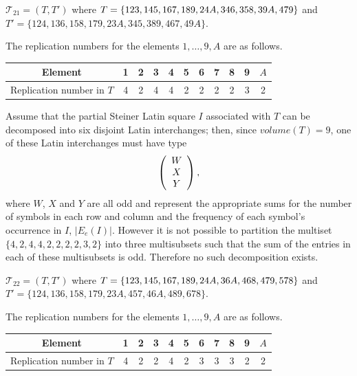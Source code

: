 \documentclass[12pt]{report}
\begin{document}
 ${\mathcal T}_{21}=(T,T')$ 
where $T=\{1 2 3,1 4 5,1 6 7,1 8 9,2 4 A, 3 4 6,3 5 8,
3 9 A,\break 4 7 9\}$ 
and $T'=\{1 2 4,1 3 6,1 5 8,1 7 9,2 3 A,3 4 5,3 8 9,4 6 7,4 9 A\}$.

The replication numbers for the elements $1,\dots, 9, A$ are as follows.

\begin{center}
\begin{tabular}{c|c|c|c|c|c|c|c|c|c|c}
Element              & 1 & 2 & 3 & 4 & 5 & 6 & 7 & 8 & 9 & $A$ \\
			  \hline
 Replication  number in $T$ & 4 & 2 & 4 & 4 & 2 & 2 & 2 & 2 & 3 & 2
\end{tabular}
\end{center}

Assume that the partial Steiner Latin square $I$ 
associated with $T$ can be decomposed into six disjoint 
Latin interchanges; then, since  $volume(T)=9$, one of these Latin 
interchanges must have type
\begin{eqnarray*}
\left(
\begin{array}{c}
    W\cr
X\\
Y
\end{array}
\right),
\end{eqnarray*}
where  $W$, $X$ and $Y$  are all odd and represent the appropriate 
sums for the number of symbols in each row and column and the
frequency of each symbol's occurrence in $I$,
$|E_e(I)|$. However it is 
not possible to partition the multiset 
$\{4,2,4,4,2,2,2,2,3,2\}$ into three multisubsets 
such that the sum of the entries in each of these multisubsets is odd.
Therefore no such decomposition exists.

 ${\mathcal T}_{22}=(T,T')$ 
where $T=\{1 2 3,1 4 5,1 6 7,1 8 9,2 4 A, 3 6 A,4 6 8,
4 7 9,\break 5 7 8\}$ 
and $T'=\{1 2 4,1 3 6,1 5 8,1 7 9,2 3 A,4 5 7,4 6 A,4 8 9,6 7 8\}$.

The replication numbers for the elements $1,\dots, 9, A$ are as
follows.

\begin{center}
\begin{tabular}{c|c|c|c|c|c|c|c|c|c|c}
Element              & 1 & 2 & 3 & 4 & 5 & 6 & 7 & 8 & 9 & $A$ \\
			  \hline
Replication  number in $T$ & 4 & 2 & 2 & 4 & 2 & 3 & 3 & 3 & 2 & 2
\end{tabular}
\end{center}
\end{document}
